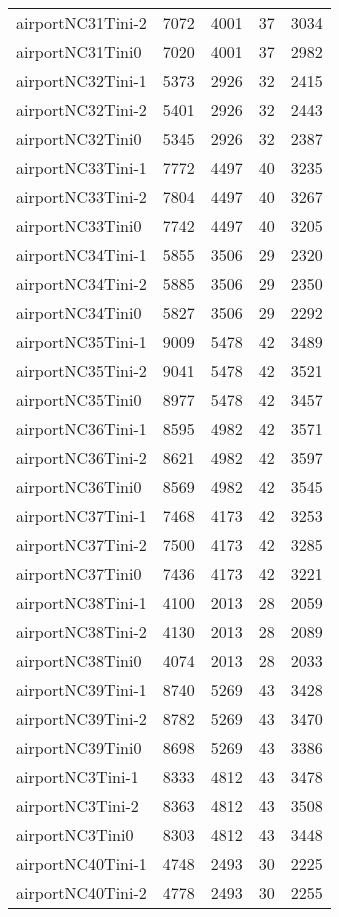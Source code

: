 \begin{longtable}{lrrrr}
airportNC31Tini-2 & 7072 & 4001 & 37 & 3034 \\
airportNC31Tini0 & 7020 & 4001 & 37 & 2982 \\
airportNC32Tini-1 & 5373 & 2926 & 32 & 2415 \\
airportNC32Tini-2 & 5401 & 2926 & 32 & 2443 \\
airportNC32Tini0 & 5345 & 2926 & 32 & 2387 \\
airportNC33Tini-1 & 7772 & 4497 & 40 & 3235 \\
airportNC33Tini-2 & 7804 & 4497 & 40 & 3267 \\
airportNC33Tini0 & 7742 & 4497 & 40 & 3205 \\
airportNC34Tini-1 & 5855 & 3506 & 29 & 2320 \\
airportNC34Tini-2 & 5885 & 3506 & 29 & 2350 \\
airportNC34Tini0 & 5827 & 3506 & 29 & 2292 \\
airportNC35Tini-1 & 9009 & 5478 & 42 & 3489 \\
airportNC35Tini-2 & 9041 & 5478 & 42 & 3521 \\
airportNC35Tini0 & 8977 & 5478 & 42 & 3457 \\
airportNC36Tini-1 & 8595 & 4982 & 42 & 3571 \\
airportNC36Tini-2 & 8621 & 4982 & 42 & 3597 \\
airportNC36Tini0 & 8569 & 4982 & 42 & 3545 \\
airportNC37Tini-1 & 7468 & 4173 & 42 & 3253 \\
airportNC37Tini-2 & 7500 & 4173 & 42 & 3285 \\
airportNC37Tini0 & 7436 & 4173 & 42 & 3221 \\
airportNC38Tini-1 & 4100 & 2013 & 28 & 2059 \\
airportNC38Tini-2 & 4130 & 2013 & 28 & 2089 \\
airportNC38Tini0 & 4074 & 2013 & 28 & 2033 \\
airportNC39Tini-1 & 8740 & 5269 & 43 & 3428 \\
airportNC39Tini-2 & 8782 & 5269 & 43 & 3470 \\
airportNC39Tini0 & 8698 & 5269 & 43 & 3386 \\
airportNC3Tini-1 & 8333 & 4812 & 43 & 3478 \\
airportNC3Tini-2 & 8363 & 4812 & 43 & 3508 \\
airportNC3Tini0 & 8303 & 4812 & 43 & 3448 \\
airportNC40Tini-1 & 4748 & 2493 & 30 & 2225 \\
airportNC40Tini-2 & 4778 & 2493 & 30 & 2255 \\

\end{longtable}
